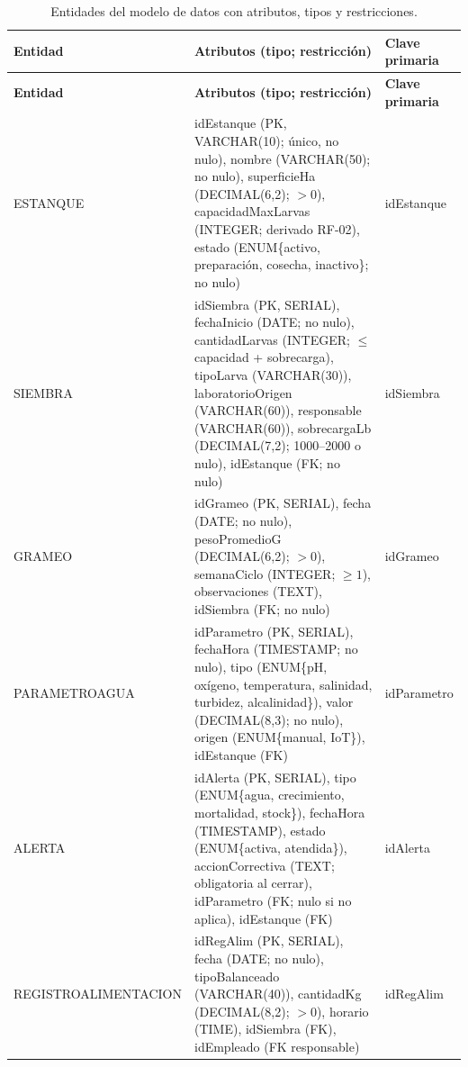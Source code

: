 \documentclass[11pt,a4paper]{article}
\renewcommand{\_}{\textunderscore\allowbreak}
\begin{document}
\renewcommand{\arraystretch}{1.2}

\begin{longtable}{|p{3.4cm}|p{8.9cm}|p{2.3cm}|}
\caption{Entidades del modelo de datos con atributos, tipos y restricciones.}
\label{tab:entidades}\\
\hline
\textbf{Entidad} & \textbf{Atributos (tipo; restricción)} & \textbf{Clave primaria} \\
\hline
\endfirsthead

\hline
\textbf{Entidad} & \textbf{Atributos (tipo; restricción)} & \textbf{Clave primaria} \\
\hline
\endhead

\hline
\endfoot

\hline
\endlastfoot

ESTANQUE &
idEstanque (PK, VARCHAR(10); único, no nulo), nombre (VARCHAR(50); no nulo), superficieHa (DECIMAL(6,2); $>0$), capacidadMaxLarvas (INTEGER; derivado RF-02), estado (ENUM\{activo, preparación, cosecha, inactivo\}; no nulo)
& idEstanque \\
\hline

SIEMBRA &
idSiembra (PK, SERIAL), fechaInicio (DATE; no nulo), cantidadLarvas (INTEGER; $\leq$ capacidad + sobrecarga), tipoLarva (VARCHAR(30)), laboratorioOrigen (VARCHAR(60)), responsable (VARCHAR(60)), sobrecargaLb (DECIMAL(7,2); 1000--2000 o nulo), idEstanque (FK; no nulo)
& idSiembra \\
\hline

GRAMEO &
idGrameo (PK, SERIAL), fecha (DATE; no nulo), pesoPromedioG (DECIMAL(6,2); $>0$), semanaCiclo (INTEGER; $\geq1$), observaciones (TEXT), idSiembra (FK; no nulo)
& idGrameo \\
\hline

PARAMETRO\_AGUA &
idParametro (PK, SERIAL), fechaHora (TIMESTAMP; no nulo), tipo (ENUM\{pH, oxígeno, temperatura, salinidad, turbidez, alcalinidad\}), valor (DECIMAL(8,3); no nulo), origen (ENUM\{manual, IoT\}), idEstanque (FK)
& idParametro \\
\hline

ALERTA &
idAlerta (PK, SERIAL), tipo (ENUM\{agua, crecimiento, mortalidad, stock\}), fechaHora (TIMESTAMP), estado (ENUM\{activa, atendida\}), accionCorrectiva (TEXT; obligatoria al cerrar), idParametro (FK; nulo si no aplica), idEstanque (FK)
& idAlerta \\
\hline

REGISTRO\_ALIMENTACION &
idRegAlim (PK, SERIAL), fecha (DATE; no nulo), tipoBalanceado (VARCHAR(40)), cantidadKg (DECIMAL(8,2); $>0$), horario (TIME), idSiembra (FK), idEmpleado (FK responsable)
& idRegAlim \\
\hline


\end{longtable}
\end{document}
